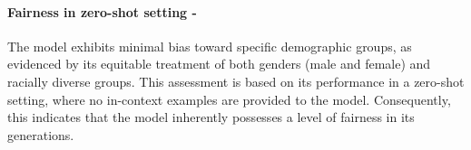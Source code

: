 \paragraph{Fairness in zero-shot setting - \low}
The model exhibits minimal bias toward specific demographic groups, as evidenced by its equitable treatment of both genders (male and female) and racially diverse groups. This assessment is based on its performance in a zero-shot setting, where no in-context examples are provided to the model. Consequently, this indicates that the model inherently possesses a level of fairness in its generations.
